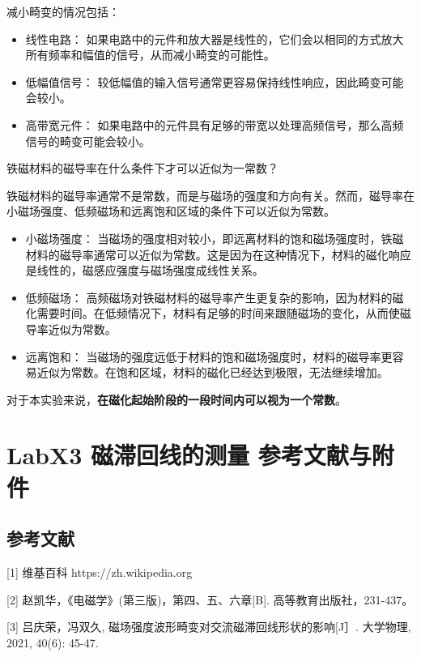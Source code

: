 \documentclass[dvipsnames, svgnames,a4paper,11pt]{article}
\begin{document}
	减小畸变的情况包括：
	\begin{itemize}
		\item 线性电路： 如果电路中的元件和放大器是线性的，它们会以相同的方式放大所有频率和幅值的信号，从而减小畸变的可能性。
		
		\item 低幅值信号： 较低幅值的输入信号通常更容易保持线性响应，因此畸变可能会较小。
		
		\item 高带宽元件： 如果电路中的元件具有足够的带宽以处理高频信号，那么高频信号的畸变可能会较小。		
	\end{itemize}
	
	\begin{question}
		铁磁材料的磁导率在什么条件下才可以近似为一常数？
	\end{question}
	铁磁材料的磁导率通常不是常数，而是与磁场的强度和方向有关。然而，磁导率在小磁场强度、低频磁场和远离饱和区域的条件下可以近似为常数。
	\begin{itemize}
		\item 小磁场强度： 当磁场的强度相对较小，即远离材料的饱和磁场强度时，铁磁材料的磁导率通常可以近似为常数。这是因为在这种情况下，材料的磁化响应是线性的，磁感应强度与磁场强度成线性关系。
		
		\item 低频磁场： 高频磁场对铁磁材料的磁导率产生更复杂的影响，因为材料的磁化需要时间。在低频情况下，材料有足够的时间来跟随磁场的变化，从而使磁导率近似为常数。
		
		\item 远离饱和： 当磁场的强度远低于材料的饱和磁场强度时，材料的磁导率更容易近似为常数。在饱和区域，材料的磁化已经达到极限，无法继续增加。
	\end{itemize}
	对于本实验来说，\textbf{在磁化起始阶段的一段时间内可以视为一个常数}。
	
	\clearpage
	\section{LabX3 磁滞回线的测量 \quad\heiti 参考文献与附件}
	\subsection{参考文献}
	[1] 维基百科 https://zh.wikipedia.org
	
	[2]	赵凯华，《电磁学》(第三版)，第四、五、六章[B]. 高等教育出版社，231-437。
	
	[3]	吕庆荣，冯双久, 磁场强度波形畸变对交流磁滞回线形状的影响[J］. 大学物理, 2021, 40(6): 45-47.
	
\end{document}
